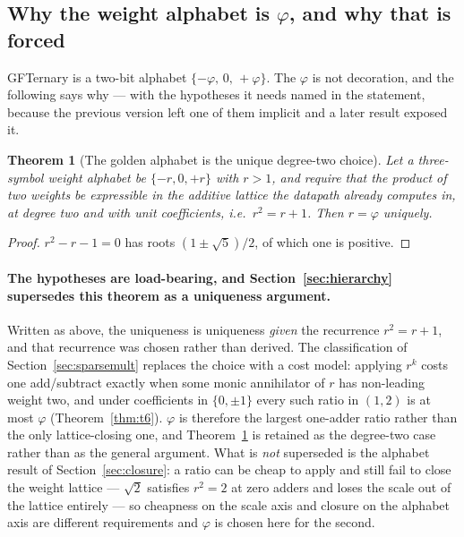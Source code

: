\documentclass[11pt]{article}
\newtheorem{theorem}{Theorem}
\theoremstyle{definition}
\begin{document}
\subsection{Why the weight alphabet is \texorpdfstring{$\varphi$}{phi}, and why that is forced}

GFTernary is a two-bit alphabet $\{-\varphi,\,0,\,+\varphi\}$. The $\varphi$ is
not decoration, and the following says why --- with the hypotheses it needs named
in the statement, because the previous version left one of them implicit and a
later result exposed it.

\begin{theorem}[The golden alphabet is the unique degree-two choice]
\label{thm:goldalpha}
Let a three-symbol weight alphabet be $\{-r,0,+r\}$ with $r>1$, and require that
the product of two weights be expressible in the additive lattice the datapath
already computes in, \emph{at degree two and with unit coefficients}, i.e.\
$r^2 = r + 1$. Then $r = \varphi$ uniquely.
\end{theorem}
\begin{proof}
$r^2 - r - 1 = 0$ has roots $(1\pm\sqrt5)/2$, of which one is positive.
\end{proof}

\paragraph{The hypotheses are load-bearing, and Section~\ref{sec:hierarchy}
supersedes this theorem as a uniqueness argument.} Written as above, the
uniqueness is uniqueness \emph{given} the recurrence $r^{2}=r+1$, and that
recurrence was chosen rather than derived. The classification of
Section~\ref{sec:sparsemult} replaces the choice with a cost model: applying
$r^{k}$ costs one add/subtract exactly when some monic annihilator of $r$ has
non-leading weight two, and under coefficients in $\{0,\pm1\}$ every such ratio
in $(1,2)$ is at most $\varphi$ (Theorem~\ref{thm:t6}). $\varphi$ is therefore
the largest one-adder ratio rather than the only lattice-closing one, and
Theorem~\ref{thm:goldalpha} is retained as the degree-two case rather than as the
general argument. What is \emph{not} superseded is the alphabet result of
Section~\ref{sec:closure}: a ratio can be cheap to apply and still fail to close
the weight lattice --- $\sqrt2$ satisfies $r^{2}=2$ at zero adders and loses the
scale out of the lattice entirely --- so cheapness on the scale axis and closure
on the alphabet axis are different requirements and $\varphi$ is chosen here for
the second.
\end{document}
